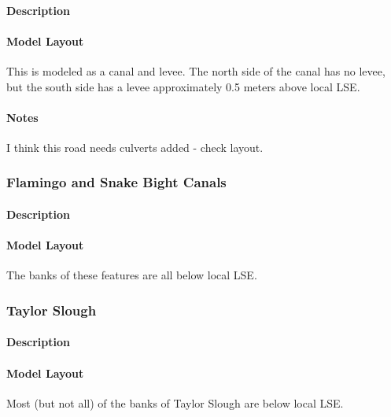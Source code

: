 \paragraph{Description}

\paragraph{Model Layout}
This is modeled as a canal and levee. The north side of the canal has no levee, but the south side has a levee approximately 0.5 meters above local LSE.

\begin{notes}
\paragraph{Notes}
I think this road needs culverts added - check layout.
\end{notes}

\clearpage
\subsubsection{Flamingo and Snake Bight Canals}
\paragraph{Description}

\paragraph{Model Layout}
The banks of these features are all below local LSE.

\clearpage
\subsubsection{Taylor Slough}
\paragraph{Description}

\paragraph{Model Layout}
Most (but not all) of the banks of Taylor Slough are below local LSE.


